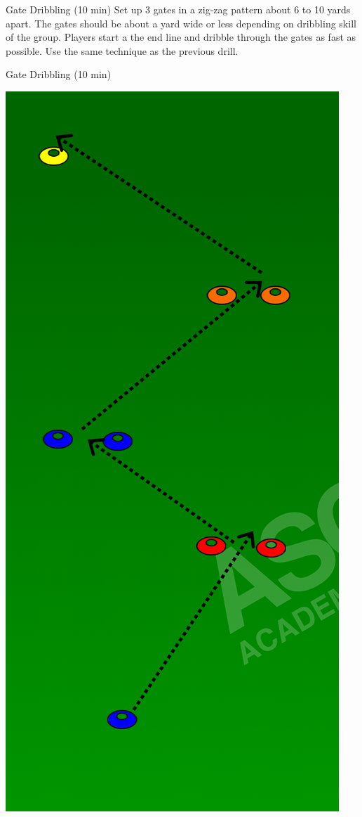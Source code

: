 \begin{evenBlock}{Gate Dribbling (10 min)}
Set up 3 gates in a zig-zag pattern about 6 to 10 yards apart.  The gates should be about a yard wide or less depending on dribbling skill of the group.  Players start a the end line and dribble through the gates as fast as possible.  Use the same technique as the previous drill.
\end{evenBlock}

\begin{oddBlock}{Gate Dribbling (10 min)}

\begin{minipage}[t]{\linewidth}
    \centering
    
    \begin{minipage}{.3\linewidth} %
            \includegraphics[width=.6\textwidth]{../img/Trimmed/Gate_Dribbling}

\end{minipage}
\end{minipage}
\end{oddBlock}
